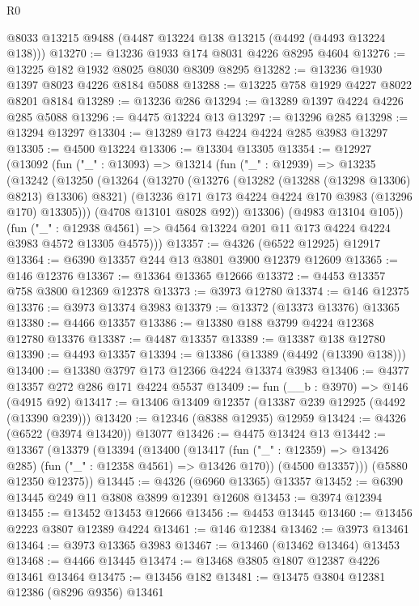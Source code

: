 \begin{lexlean}{R0}
\begin{coremodule}
    @8033
    @13215
    @9488
    (@4487 @13224 @138 @13215 (@4492 (@4493 @13224 @138)))
@13270 := @13236 @1933 @174 @8031 @4226 @8295 @4604
@13276 := @13225 @182 @1932 @8025 @8030 @8309 @8295
@13282 := @13236 @1930 @1397 @8023 @4226 @8184 @5088
@13288 := @13225 @758 @1929 @4227 @8022 @8201 @8184
@13289 := @13236 @286
@13294 := @13289 @1397 @4224 @4226 @285 @5088
@13296 := @4475 @13224 @13
@13297 := @13296 @285
@13298 := @13294 @13297
@13304 := @13289 @173 @4224 @4224 @285 @3983 @13297
@13305 := @4500 @13224
@13306 := @13304 @13305
@13354 := @12927
    (@13092
      (fun ("_" : @13093) =>
      @13214
        (fun ("_" : @12939) =>
        @13235
          (@13242
            (@13250
              (@13264
                (@13270
                  (@13276 (@13282 (@13288 (@13298 @13306) @8213) @13306) @8321)
                  (@13236 @171 @173 @4224 @4224 @170 @3983 (@13296 @170) @13305)))
              (@4708 @13101 @8028 @92))
            @13306)
          (@4983 @13104 @105))
        (fun ("_" : @12938 @4561) =>
        @4564 @13224 @201 @11 @173 @4224 @4224 @3983 @4572 @13305 @4575)))
@13357 := @4326 (@6522 @12925) @12917
@13364 := @6390 @13357 @244 @13 @3801 @3900 @12379 @12609
@13365 := @146 @12376
@13367 := @13364 @13365 @12666
@13372 := @4453 @13357 @758 @3800 @12369 @12378
@13373 := @3973 @12780
@13374 := @146 @12375
@13376 := @3973 @13374 @3983
@13379 := @13372 (@13373 @13376) @13365
@13380 := @4466 @13357
@13386 := @13380 @188 @3799 @4224 @12368 @12780 @13376
@13387 := @4487 @13357
@13389 := @13387 @138 @12780
@13390 := @4493 @13357
@13394 := @13386 (@13389 (@4492 (@13390 @138)))
@13400 := @13380 @3797 @173 @12366 @4224 @13374 @3983
@13406 := @4377 @13357 @272 @286 @171 @4224 @5537
@13409 := fun (__b : @3970) => @146 (@4915 @92)
@13417 := @13406 @13409 @12357 (@13387 @239 @12925 (@4492 (@13390 @239)))
@13420 := @12346 (@8388 @12935) @12959
@13424 := @4326 (@6522 (@3974 @13420)) @13077
@13426 := @4475 @13424 @13
@13442 := @13367
    (@13379
      (@13394
        (@13400
          (@13417 (fun ("_" : @12359) => @13426 @285) (fun ("_" : @12358 @4561) => @13426 @170))
          (@4500 @13357)))
      (@5880 @12350 @12375))
@13445 := @4326 (@6960 @13365) @13357
@13452 := @6390 @13445 @249 @11 @3808 @3899 @12391 @12608
@13453 := @3974 @12394
@13455 := @13452 @13453 @12666
@13456 := @4453 @13445
@13460 := @13456 @2223 @3807 @12389 @4224
@13461 := @146 @12384
@13462 := @3973 @13461
@13464 := @3973 @13365 @3983
@13467 := @13460 (@13462 @13464) @13453
@13468 := @4466 @13445
@13474 := @13468 @3805 @1807 @12387 @4226 @13461 @13464
@13475 := @13456 @182
@13481 := @13475 @3804 @12381 @12386 (@8296 @9356) @13461

\end{coremodule}
\end{lexlean}
